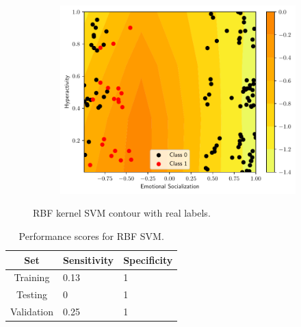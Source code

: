 \begin{figure}
\begin{subfigure}[b]{0.32\textwidth}
    \centering \includegraphics[width=\textwidth]{figs/svm-rbf-contour-2-5.pdf}
    \caption{}
  \end{subfigure}
  \caption{RBF kernel SVM contour with real labels.}
  \label{fig:SVM-rbf}
\end{figure}

\begin{table}
  \centering
  \caption{Performance scores for RBF SVM.}
  \label{tab:rbf_SVM}
  \begin{tabular}{cll}
    \hline
    \textbf{Set} & \multicolumn{1}{c}{\textbf{Sensitivity}} & \multicolumn{1}{c}{\textbf{Specificity}} \\ \hline
    Training & 0.13 & 1 \\
    Testing & 0 & 1 \\
    Validation & 0.25 & 1 \\ \hline
  \end{tabular}
\end{table}
